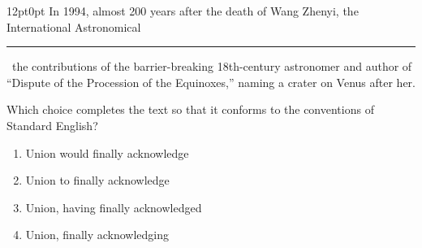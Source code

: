 \documentclass[11pt, twocolumn]{article}
\newcounter{questionnum}
\begin{document}
\vspace{6pt}\noindent
\begin{minipage}{\columnwidth}\raggedright
\noindent{}\par\vspace{8pt}
\begin{adjustwidth}{12pt}{0pt}
In 1994, almost 200 years after the death of Wang Zhenyi, the International Astronomical \,\rule{2cm}{0.4pt}\, the contributions of the barrier-breaking 18th-century astronomer and author of ``Dispute of the Procession of the Equinoxes,'' naming a crater on Venus after her.
\vspace{6pt}

Which choice completes the text so that it conforms to the conventions of Standard English?
\begin{enumerate}[label=\Alph*),leftmargin=18pt,topsep=3pt,itemsep=2pt]
  \item Union would finally acknowledge
  \item Union to finally acknowledge
  \item Union, having finally acknowledged
  \item Union, finally acknowledging
\end{enumerate}
\end{adjustwidth}
\end{minipage}\par
\end{document}
